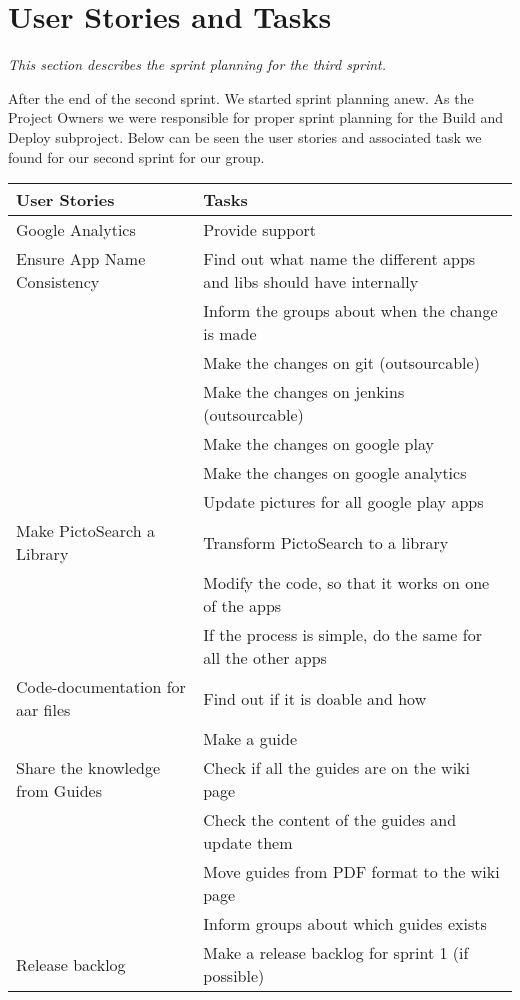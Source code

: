 \section{User Stories and Tasks} \label{Sprint3_SecUserStoriesAndTasks}
\textit{This section describes the sprint planning for the third sprint.}

After the end of the second sprint. We started sprint planning anew. As the Project Owners we were responsible for proper sprint planning for the Build and Deploy subproject. Below can be seen the user stories and associated task we found for our second sprint for our group.

\begin{table}[H]
	\centering
	\begin{tabular}{ll}
		\textbf{User Stories} & \textbf{Tasks}\\ \hline \noalign{\vskip 2mm}
		Google Analytics & Provide support\\ \hline
		Ensure App Name Consistency & Find out what name the different apps and libs should have internally\\
		& Inform the groups about when the change is made\\
		& Make the changes on git (outsourcable) \\
		& Make the changes on jenkins (outsourcable) \\
		& Make the changes on google play \\
		& Make the changes on google analytics \\
		& Update pictures for all google play apps\\ \hline
		Make PictoSearch a Library & Transform PictoSearch to a library \\
		& Modify the code, so that it works on one of the apps \\
		& If the process is simple, do the same for all the other apps \\ \hline
		Code-documentation for aar files & Find out if it is doable and how \\
		& Make a guide \\ \hline
		Share the knowledge from Guides & Check if all the guides are on the wiki page \\
		& Check the content of the guides and update them \\
		& Move guides from PDF format to the wiki page \\
		& Inform groups about which guides exists \\ \hline
		Release backlog &  Make a release backlog for sprint 1 (if possible) \\

\end{tabular}
\end{table}
